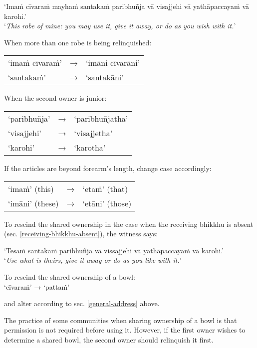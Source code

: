 ‘Imaṁ cīvaraṁ mayhaṁ santakaṁ paribhuñja vā visajjehi vā yathāpaccayaṁ vā karohi.’\\
‘\emph{This robe of mine: you may use it, give it away, or do as you wish with it.}’


When more than one robe is being relinquished:

\begin{tabular}{@{}lll@{}}
‘imaṁ cīvaraṁ’ & → & ‘imāni cīvarāni’\\
‘santakaṁ’ & → & ‘santakāni’\\
\end{tabular}

When the second owner is junior:

\begin{tabular}{@{}lll@{}}
‘paribhuñja’ & → & ‘paribhuñjatha’\\
‘visajjehi’ & → & ‘visajjetha’\\
‘karohi’ & → & ‘karotha’\\
\end{tabular}

If the articles are beyond forearm's length, change case accordingly:

\begin{tabular}{@{}lll@{}}
  ‘imaṁ’ (this) & → & ‘etaṁ’ (that)\\
  ‘imāni’ (these) & → & ‘etāni’ (those)\\
\end{tabular}

To rescind the shared ownership in the case when the receiving bhikkhu is absent
(sec. \ref{receiving-bhikkhu-absent}), the witness says:

‘Tesaṁ santakaṁ paribhuñja vā vissajjehi vā yathāpaccayaṁ vā karohi.’\\
‘\emph{Use what is theirs, give it away or do as you like with it.}’

To rescind the shared ownership of a bowl:\\
‘cīvaraṁ’ → ‘pattaṁ’

and alter according to sec. \ref{general-address} above.

The practice of some communities when sharing ownership of a bowl is that
permission is not required before using it. However, if the first owner wishes
to determine a shared bowl, the second owner should relinquish it first.

